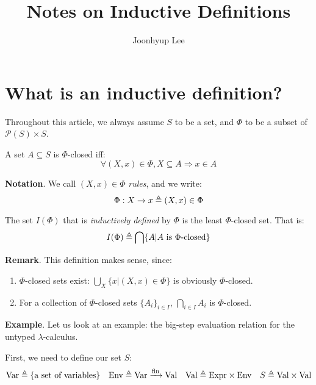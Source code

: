 \documentclass[12pt]{article}
\title{Notes on Inductive Definitions}
\author{Joonhyup Lee}
\begin{document}
\maketitle
\section{What is an inductive definition?}\label{sec:inddef}
Throughout this article, we always assume $S$ to be a set, and $\Phi$ to be a subset of $\mathcal{P}(S)\times S$.
\begin{definition}
	A set $A\subseteq S$ is $\Phi$-closed iff:
	\[\forall(X,x)\in\Phi,X\subseteq A\Rightarrow x\in A\]
\end{definition}

\noindent\textbf{Notation}. We call $(X,x)\in\Phi$ \emph{rules}, and we write:
\[\Phi:X\rightarrow x\triangleq(X,x)\in\Phi\]

\begin{definition}
	The set $I(\Phi)$ that is \emph{inductively defined} by $\Phi$ is the least $\Phi$-closed set.
	That is:
	\[I(\Phi)\triangleq\bigcap\{A|A\text{ is }\Phi\text{-closed}\}\]
\end{definition}

\noindent\textbf{Remark}. This definition makes sense, since:
\begin{enumerate}
	\item $\Phi$-closed sets exist: $\bigcup_X\{x|(X,x)\in\Phi\}$ is obviously $\Phi$-closed.
	\item For a collection of $\Phi$-closed sets $\{A_i\}_{i\in I}$, $\bigcap_{i\in I}A_i$ is $\Phi$-closed.
\end{enumerate}

\noindent\textbf{Example}. Let us look at an example: the big-step evaluation relation for the untyped $\lambda$-calculus.

First, we need to define our set $S$:
\[\text{Var}\triangleq\{\text{a set of variables}\}\quad\text{Env}\triangleq\text{Var}\xrightarrow{\text{fin}}\text{Val}\quad\text{Val}\triangleq\text{Expr}\times\text{Env}\quad S\triangleq\text{Val}\times\text{Val}\]
\end{document}
